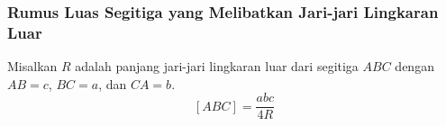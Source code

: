 \subsubsection{Rumus Luas Segitiga yang Melibatkan Jari-jari Lingkaran Luar}
Misalkan $R$ adalah panjang jari-jari lingkaran luar dari segitiga $ABC$ dengan $AB=c$, $BC=a$, dan $CA=b$.
$$[ABC]  =  \dfrac{abc}{4R}$$
